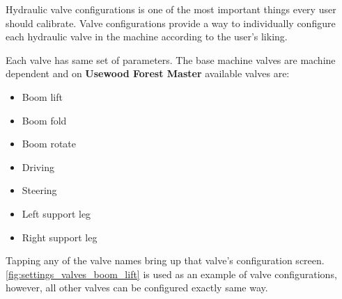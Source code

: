 \documentclass[12pt,a4paper,english]{uvmanual}
\begin{document}
Hydraulic valve configurations is one of the most important things every user should calibrate. Valve configurations provide a way to individually configure each hydraulic valve in the machine according to the user's liking. 


Each valve has same set of parameters. The base machine valves are machine dependent and on \textbf{Usewood Forest Master} available valves are:

\begin{itemize}
 \item Boom lift
 \item Boom fold
 \item Boom rotate
 \item Driving
 \item Steering
 \item Left support leg
 \item Right support leg
\end{itemize}

Tapping any of the valve names bring up that valve's configuration screen. \autoref{fig:settings_valves_boom_lift} is used as an example of valve configurations, however, all other valves can be configured exactly same way.


\end{document}
